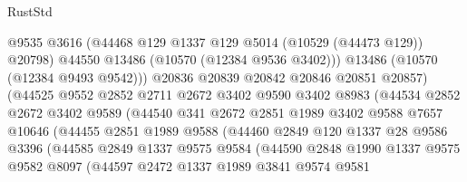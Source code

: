 \begin{lexlean}{RustStd}
\begin{coremodule}
                              @9535
                              @3616
                              (@44468 @129 @1337 @129 @5014 (@10529 (@44473 @129)) @20798)
                              @44550
                              @13486
                              (@10570 (@12384 @9536 @3402)))
                            @13486
                            (@10570 (@12384 @9493 @9542)))
                          @20836
                          @20839
                          @20842
                          @20846
                          @20851
                          @20857)
                        (@44525
                          @9552
                          @2852
                          @2711
                          @2672
                          @3402
                          @9590
                          @3402
                          @8983
                          (@44534
                            @2852
                            @2672
                            @3402
                            @9589
                            (@44540
                              @341
                              @2672
                              @2851
                              @1989
                              @3402
                              @9588
                              @7657
                              @10646
                              (@44455
                                @2851
                                @1989
                                @9588
                                (@44460
                                  @2849
                                  @120
                                  @1337
                                  @28
                                  @9586
                                  @3396
                                  (@44585
                                    @2849
                                    @1337
                                    @9575
                                    @9584
                                    (@44590
                                      @2848
                                      @1990
                                      @1337
                                      @9575
                                      @9582
                                      @8097
                                      (@44597
                                        @2472
                                        @1337
                                        @1989
                                        @3841
                                        @9574
                                        @9581

\end{coremodule}
\end{lexlean}
